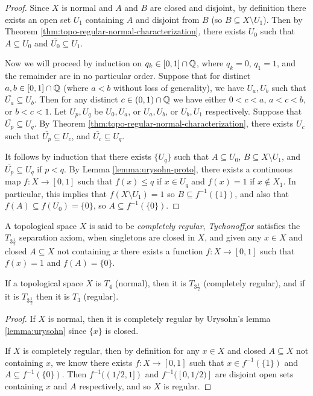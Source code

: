 \begin{proof}
    Since $X$ is normal and $A$ and $B$ are closed and disjoint, by definition there exists an open set $U_1$ containing $A$ and disjoint from $B$ (so $B \subseteq X \setminus U_1$). Then by Theorem \ref{thm:topo-regular-normal-characterization}, there exists $U_0$ such that $A \subseteq U_0$ and $\bar{U_0} \subseteq U_1$.

    Now we will proceed by induction on $q_k \in [0, 1] \cap \mathbb{Q}$, where $q_k = 0$, $q_1 = 1$, and the remainder are in no particular order. Suppose that for distinct $a, b \in [0, 1] \cap \mathbb{Q}$ (where $a < b$ without loss of generality), we have $U_a, U_b$ such that $\bar{U_a} \subseteq U_b$. Then for any distinct $c \in (0, 1) \cap \mathbb{Q}$ we have either $0 < c < a$, $a < c < b$, or $b < c < 1$. Let $U_p, U_q$ be $U_0, U_a$, or $U_a,U_b$, or $U_b,U_1$ respectively. Suppose that $\bar{U_p} \subseteq U_q$. By Theorem \ref{thm:topo-regular-normal-characterization}, there exists $U_c$ such that $\bar{U_p} \subseteq U_c$, and $\bar{U_c} \subseteq U_q$.

    It follows by induction that there exists $\{U_q\}$ such that $A \subseteq U_0$, $B\subseteq X\setminus U_1$, and $\bar{U_p} \subseteq U_q$ if $p < q$. By Lemma \ref{lemma:urysohn-proto}, there exists a continuous map $f: X \to [0, 1]$ such that $f(x) \leq q$ if $x \in U_q$ and $f(x) = 1$ if $x \not\in X_1$. In particular, this implies that $f(X \setminus U_1) = 1$ so $B \subseteq f^{-1}(\{1\})$, and also that $f(A) \subseteq f(U_0) = \{0\}$, so $A \subseteq f^{-1}(\{0\})$.
\end{proof}

\begin{defn}
    A topological space $X$ is said to be \emph{completely regular}, \emph{Tychonoff},or satisfies the $T_{3\frac{1}{2}}$ separation axiom, when singletons are closed in $X$, and given any $x \in X$ and closed $A \subseteq X$ not containing $x$ there exists a function $f: X \to [0, 1]$ such that $f(x) = 1$ and $f(A) = \{0\}$.
\end{defn}

\begin{prop}
    If a topological space $X$ is $T_4$ (normal), then it is $T_{3\frac{1}{2}}$ (completely regular), and if it is $T_{3\frac{1}{2}}$ then it is $T_3$ (regular).
\end{prop}

\begin{proof}
    If $X$ is normal, then it is completely regular by Urysohn's lemma \ref{lemma:urysohn} since $\{x\}$ is closed.

    If $X$ is completely regular, then by definition for any $x \in X$ and closed $A \subseteq X$ not containing $x$, we know there exists $f: X \to [0, 1]$ such that $x \in f^{-1}(\{1\})$ and $A \subseteq f^{-1}(\{0\})$. Then $f^{-1}((1/2, 1])$ and $f^{-1}([0, 1/2)]$ are disjoint open sets containing $x$ and $A$ respectively, and so $X$ is regular.
\end{proof}

